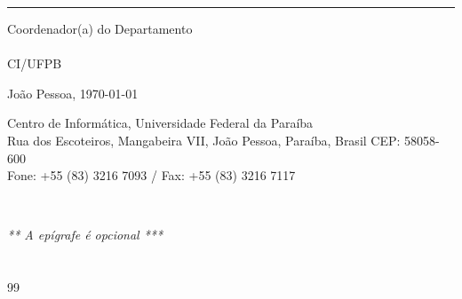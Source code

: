 \documentclass{tcc}
\begin{document}
\hrule
\noindent Coordenador(a) do Departamento \departamento\\
\coordenador\\
CI/UFPB\\

\vfill

\begin{center}
João Pessoa, \today
\end{center}

\vspace{0.05in}

\begin{center}
\footnotesize{ Centro de Informática, Universidade Federal da Paraíba\\
Rua dos Escoteiros, Mangabeira VII, João Pessoa, Paraíba, Brasil CEP: 58058-600\\
Fone: +55 (83) 3216 7093 / Fax: +55 (83) 3216 7117}
\end{center}
\afterpage{\blankpage \addtocounter{page}{1}}
\newpage
$ $
\vfill

\begin{flushright}
\em *** A epígrafe é opcional ***
\end{flushright}

\afterpage{\blankpage \addtocounter{page}{1}}

\newpage

\section*{} 


\newpage



\newpage


\newpage



\newpage

\renewcommand{\listfigurename}{\centering LISTA DE FIGURAS}
\listoffigures
\newpage

\renewcommand{\listtablename}{\centering LISTA DE TABELAS}
\listoftables
\newpage



\newpage


\pagestyle{plain} %
\tableofcontents

\newpage





\renewcommand{\refname}{\centering REFERÊNCIAS} %
\begin{thebibliography}{99}

\end{thebibliography}


\end{document}
